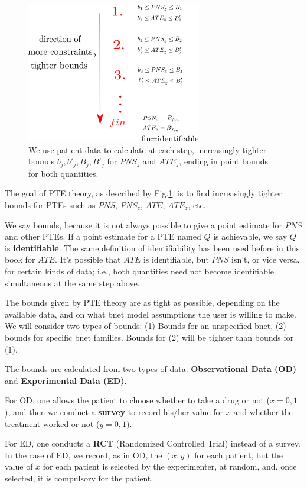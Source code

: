 \begin{figure}[h!]
\centering
\includegraphics[width=3in]
{personalized/personalized-goal.png}
\caption{We use patient data 
to calculate at each step, increasingly
tighter bounds
$b_j, b'_j, B_j, B'_j$
for $PNS_z$ and $ATE_z$,
ending in point bounds
for both quantities. } 
\label{fig-personalized-goal}
\end{figure}

The goal of PTE theory, as
described by 
Fig.\ref{fig-personalized-goal}, is
to find
increasingly 
tighter bounds for
PTEs such as $PNS$, 
$PNS_z$, $ATE$, $ATE_z$, etc..


We say bounds, because 
it is not always possible
to give a point estimate
for $PNS$ and other
PTEs.
If a point estimate for a PTE named $Q$
is achievable, we say $Q$
is {\bf identifiable}.
The same definition
of identifiability 
has been used before in this book 
for $ATE$.
It's possible that 
$ATE$ is identifiable,
but $PNS$ isn't,
or vice versa, for certain kinds
of data; i.e., both
quantities need not
become identifiable 
simultaneous at the
same step above.


 The
bounds given by PTE theory
are
as tight as possible,
depending on 
the available data,
and on what bnet model 
assumptions
the user is willing to make.
We will consider two types of bounds: 
(1) Bounds for an unspecified bnet,
(2) bounds for specific bnet families.
Bounds for (2) will be tighter
than bounds for (1).


The bounds are calculated from
 two types of data:
{\bf Observational Data (OD)} and 
{\bf Experimental Data (ED)}.

For OD, one allows 
the patient to 
choose whether to take
a drug 
or not ($x=0,1$),
and then we conduct a {\bf survey}
to record his/her 
value for $x$ 
and whether the treatment
worked or not ($y=0,1$).

For ED, one conducts a {\bf RCT}
(Randomized Controlled Trial)
instead of a survey.
In the case of ED, 
we record, as in OD, the $(x,y)$
for each patient, but
the value of $x$ for each
patient is selected by the
experimenter, at random,
and, once selected, it
 is compulsory for the
patient.

